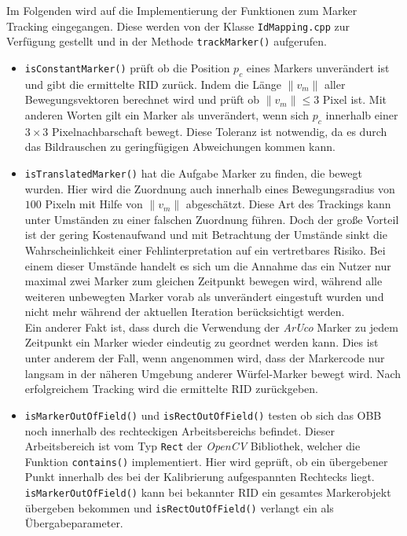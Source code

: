 Im Folgenden wird auf die Implementierung der Funktionen zum Marker Tracking eingegangen. Diese werden von der Klasse \texttt{IdMapping.cpp} zur Verfügung gestellt und in der Methode \texttt{track\-Marker()} aufgerufen.
\begin{itemize}
\item \texttt{is\-Constant\-Marker()} prüft ob die Position $p_c$ eines Markers unverändert ist und gibt die ermittelte RID zurück. Indem die Länge $\|v_m\|$ aller Bewegungsvektoren berechnet wird und prüft ob $\|v_m\|\le 3$ Pixel ist. Mit anderen Worten gilt ein Marker als unverändert, wenn sich $p_c$ innerhalb einer $3 \times 3$ Pixelnachbarschaft bewegt. Diese Toleranz ist notwendig, da es durch das Bildrauschen zu geringfügigen Abweichungen kommen kann.
\item \texttt{is\-Translated\-Marker()} hat die Aufgabe Marker zu finden, die bewegt wurden. Hier wird die Zuordnung auch innerhalb eines Bewegungsradius von $100$ Pixeln mit Hilfe von $\|v_m\|$  abgeschätzt. Diese Art des Trackings kann unter Umständen zu einer falschen Zuordnung führen. Doch der große Vorteil ist der gering Kostenaufwand und mit Betrachtung der Umstände sinkt die Wahrscheinlichkeit einer Fehlinterpretation auf ein vertretbares Risiko. Bei einem dieser Umstände handelt es sich um die Annahme das ein Nutzer nur maximal zwei Marker zum gleichen Zeitpunkt bewegen wird, während alle weiteren unbewegten Marker vorab als unverändert eingestuft wurden und nicht mehr während der aktuellen Iteration berücksichtigt werden.\\
Ein anderer Fakt ist, dass durch die Verwendung der \textit{ArUco} Marker zu jedem Zeitpunkt ein Marker wieder eindeutig zu geordnet werden kann. Dies ist unter anderem der Fall, wenn angenommen wird, dass der Markercode nur langsam in der näheren Umgebung anderer Würfel-Marker bewegt wird. Nach erfolgreichem Tracking wird die ermittelte RID zurückgeben.
\item \texttt{isMarker\-Out\-OfField()} und \texttt{is\-Rect\-Out\-Of\-Field()} testen ob sich das OBB noch innerhalb des rechteckigen Arbeitsbereichs befindet. Dieser Arbeitsbereich ist vom Typ \texttt{Rect} der \textit{OpenCV} Bibliothek, welcher die Funktion \texttt{contains()} implementiert. Hier wird geprüft, ob ein übergebener Punkt innerhalb des bei der Kalibrierung aufgespannten Rechtecks liegt. \texttt{isMarker\-OutOf\-Field()} kann bei bekannter RID ein gesamtes Markerobjekt übergeben bekommen und \texttt{is\-Rect\-Out\-Of\-Field()} verlangt ein  als Übergabeparameter.

\end{itemize}
